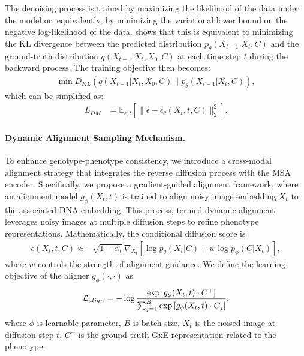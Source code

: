 The denoising process is trained by maximizing the likelihood of the data under the model or, equivalently, by minimizing the variational lower bound on the negative log-likelihood of the data. \cite{ho2020denoising} shows that this is equivalent to minimizing the KL divergence between the predicted distribution $p_{\theta} (X_{t-1} | X_{t}, C)$ and the ground-truth distribution $q (X_{t-1} | X_{t}, X_{0}, C)$ at each time step $t$ during the backward process. The training objective then becomes:
%
\begin{align}
    \min\nolimits D_{KL} \left( q \left( X_{t-1} | X_{t}, X_{0}, C \right) \big\| p_{\theta} \left( X_{t-1} | X_{t}, C \right) \right),
\end{align}
%
which can be simplified as:
%
\begin{align}
    L_{DM} &= \mathbb{E}_{\epsilon, t} \left[\| \epsilon - \epsilon_{\theta} (X_t, t, C) \|_{2}^{2}\right]. 
    \label{eq:loss}
\end{align}






\paragraph{Dynamic Alignment Sampling Mechanism.}    To enhance genotype-phenotype consistency, we introduce a cross-modal alignment strategy that integrates the reverse diffusion process with the MSA encoder. 
Specifically, we propose a gradient-guided alignment framework, where an alignment model $g_{\phi}(X_t, t)$ is trained to align noisy image embedding $X_t$ to the associated DNA embedding.
This process, termed dynamic alignment, leverages noisy images at multiple diffusion steps to refine phenotype representations.
Mathematically, the conditional diffusion score \cite{ho2022classifier} is 
{\small
\begin{align*}
    \epsilon(X_t, t, C) \approx -\sqrt{1-\alpha_t} \nabla_{X_t} \left[\log{p_{\theta}(X_t|C)} + w \log{p_{\phi}(C|X_t)}\right],
\end{align*}
}
where $w$ controls the strength of alignment guidance.
We define the learning objective of the aligner $g_{\phi}(\cdot,\cdot)$  as
\begin{align}
\label{eq:aligner}
    {\mathcal{L}}_{align} = - \log \frac{\exp{\left[g_{\phi}(X_t,t) \cdot C^+ \right]}}{\sum_{j=1}^B \exp{\left[g_{\phi}(X_t,t) \cdot C_j \right]}},
\end{align}
where $\phi$ is learnable parameter, $B$ is  batch size, $X_t$ is the noised image at diffusion step $t$,  $C^+$ is the ground-truth GxE representation related to the phenotype. %

